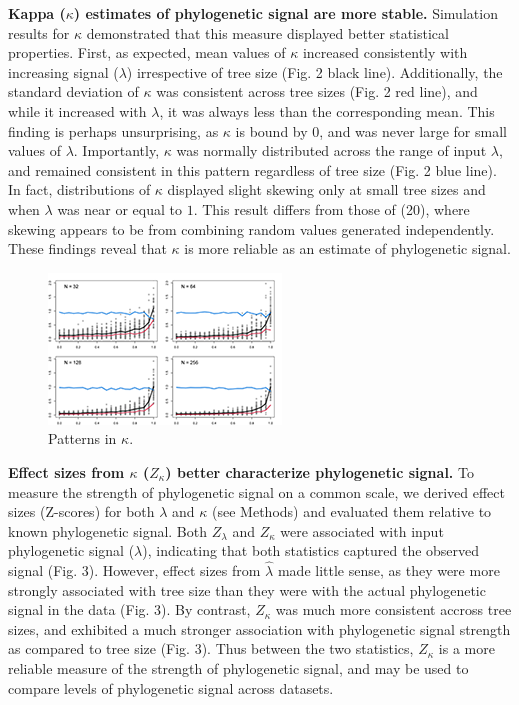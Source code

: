 \documentclass[9pt,twocolumn,twoside,lineno]{pnas-new}
\begin{document}
\textbf{Kappa (\(\kappa\)) estimates of phylogenetic signal are more
stable.} Simulation results for \(\kappa\) demonstrated that this
measure displayed better statistical properties. First, as expected,
mean values of \(\kappa\) increased consistently with increasing signal
(\(\lambda\)) irrespective of tree size (Fig. 2 black line).
Additionally, the standard deviation of \(\kappa\) was consistent across
tree sizes (Fig. 2 red line), and while it increased with \(\lambda\),
it was always less than the corresponding mean. This finding is perhaps
unsurprising, as \(\kappa\) is bound by 0, and was never large for small
values of \(\lambda\). Importantly, \(\kappa\) was normally distributed
across the range of input \(\lambda\), and remained consistent in this
pattern regardless of tree size (Fig. 2 blue line). In fact,
distributions of \(\kappa\) displayed slight skewing only at small tree
sizes and when \(\lambda\) was near or equal to \(1\). This result
differs from those of (20), where skewing appears to be from combining
random values generated independently. These findings reveal that
\(\kappa\) is more reliable as an estimate of phylogenetic signal.

\begin{figure}
\centering
\includegraphics{new.fig.2.temp.png}
\caption{Patterns in \(\kappa\).{}}
\end{figure}

\textbf{Effect sizes from \(\kappa\) (\(Z_{\kappa}\)) better
characterize phylogenetic signal.} To measure the strength of
phylogenetic signal on a common scale, we derived effect sizes
(Z-scores) for both \(\lambda\) and \(\kappa\) (see Methods) and
evaluated them relative to known phylogenetic signal. Both
\(Z_{\lambda}\) and \(Z_{\kappa}\) were associated with input
phylogenetic signal (\(\lambda\)), indicating that both statistics
captured the observed signal (Fig. 3). However, effect sizes from
\(\hat{\lambda}\) made little sense, as they were more strongly
associated with tree size than they were with the actual phylogenetic
signal in the data (Fig. 3). By contrast, \(Z_{\kappa}\) was much more
consistent accross tree sizes, and exhibited a much stronger association
with phylogenetic signal strength as compared to tree size (Fig. 3).
Thus between the two statistics, \(Z_{\kappa}\) is a more reliable
measure of the strength of phylogenetic signal, and may be used to
compare levels of phylogenetic signal across datasets.
\end{document}
